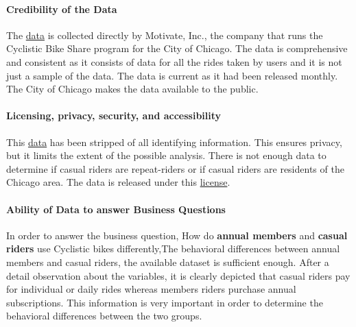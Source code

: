 \documentclass[
]{article}
\begin{document}
\hypertarget{credibility-of-the-data}{%
\paragraph{\texorpdfstring{\textbf{Credibility of the
Data}}{Credibility of the Data}}\label{credibility-of-the-data}}

The \href{https://divvy-tripdata.s3.amazonaws.com/index.html}{data} is
collected directly by Motivate, Inc., the company that runs the
Cyclistic Bike Share program for the City of Chicago. The data is
comprehensive and consistent as it consists of data for all the rides
taken by users and it is not just a sample of the data. The data is
current as it had been released monthly. The City of Chicago makes the
data available to the public.

\hypertarget{licensing-privacy-security-and-accessibility}{%
\paragraph{\texorpdfstring{\textbf{Licensing, privacy, security, and
accessibility}}{Licensing, privacy, security, and accessibility}}\label{licensing-privacy-security-and-accessibility}}

This \href{https://divvy-tripdata.s3.amazonaws.com/index.html}{data} has
been stripped of all identifying information. This ensures privacy, but
it limits the extent of the possible analysis. There is not enough data
to determine if casual riders are repeat-riders or if casual riders are
residents of the Chicago area. The data is released under this
\href{https://ride.divvybikes.com/data-license-agreement}{license}.

\hypertarget{ability-of-data-to-answer-business-questions}{%
\paragraph{\texorpdfstring{\textbf{Ability of Data to answer Business
Questions}}{Ability of Data to answer Business Questions}}\label{ability-of-data-to-answer-business-questions}}

In order to answer the business question, How do \textbf{annual members}
and \textbf{casual riders} use Cyclistic bikes differently,The
behavioral differences between annual members and casual riders, the
available dataset is sufficient enough. After a detail observation about
the variables, it is clearly depicted that casual riders pay for
individual or daily rides whereas members riders purchase annual
subscriptions. This information is very important in order to determine
the behavioral differences between the two groups.
\end{document}
